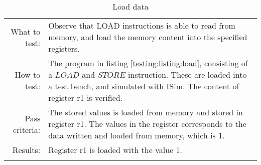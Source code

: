 \begin{table}[H]
  \begin{tabular}{r | p{8cm}}
    \noalign{\smallskip}\hline\noalign{\smallskip}
    
    What to test:  & Observe that LOAD instructions is able to read from memory, and load the
                     memory content into the specified registers.  \\

    \noalign{\smallskip}\hline\noalign{\smallskip}

    How to test:   & The program in listing \ref{testing:listing:load}, consisting  of a $LOAD$ and $STORE$
                     instruction. These are loaded into a test bench, and simulated with 
                     ISim. The content of register r1 is verified. \\
                     

    \noalign{\smallskip}\hline\noalign{\smallskip}

    Pass criteria: &  The stored values is loaded from memory and stored in register r1. 
                      The values in the register corresponds to the data written and loaded 
                      from memory, which is 1.\\

    \noalign{\smallskip}\hline\noalign{\smallskip}
    
    Results: &  Register r1 is loaded with the value 1. \\
   \noalign{\smallskip}\hline\noalign{\smallskip}
  
  
  
  \end{tabular}
  \caption{Load data}
  \label{testing:fitness:load_data}
\end{table}

